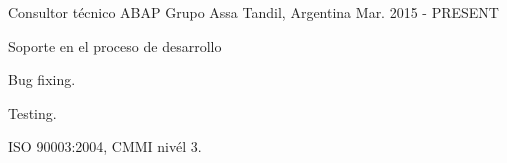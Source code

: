 


\begin{cventries}


\cventry
{Consultor técnico ABAP} %
{Grupo Assa} %
{Tandil, Argentina} %
{Mar. 2015 - PRESENT} %
{ %
\begin{cvitems}
\item {Soporte en el proceso de desarrollo}
\item {Bug fixing.}
\item {Testing.}
\item {ISO 90003:2004, CMMI nivél 3.}
\end{cvitems}
}

\end{cventries}
